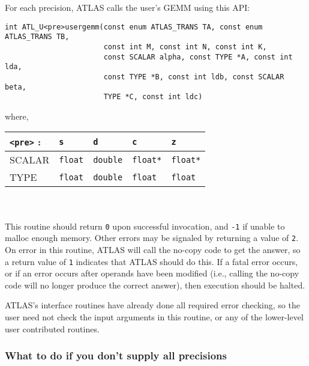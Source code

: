 \documentclass[11pt]{article}
\begin{document}
For each precision, ATLAS calls the user's GEMM using this API:
\begin{verbatim}
int ATL_U<pre>usergemm(const enum ATLAS_TRANS TA, const enum ATLAS_TRANS TB,
                       const int M, const int N, const int K,
                       const SCALAR alpha, const TYPE *A, const int lda,
                       const TYPE *B, const int ldb, const SCALAR beta,
                       TYPE *C, const int ldc)
\end{verbatim}
where,\\
\begin{tabular}{||l|l|l|l|l||}\hline\hline
\verb+<pre>+ : & {\tt s} & {\tt d} & {\tt c} & {\tt z} \\\hline\hline
SCALAR & {\tt float} & {\tt double} & {\tt float*} & {\tt float*} \\\hline
TYPE   & {\tt float} & {\tt double} & {\tt float} & {\tt float} \\\hline\hline
\end{tabular}\\\\

This routine should return {\tt 0} upon successful invocation, and 
{\tt -1} if unable to malloc enough memory.  Other errors may be
signaled by returning a value of {\tt 2}.  On error in this routine,
ATLAS will call the no-copy code to get the answer, so a return value
of {\tt 1} indicates that ATLAS should do this.  If a fatal error
occurs, or if an error occurs after operands have been modified (i.e.,
calling the no-copy code will no longer produce the correct answer),
then execution should be halted.

ATLAS's interface routines have already done all required error checking,
so the user need not check the input arguments in this routine, or any
of the lower-level user contributed routines.

\subsubsection{What to do if you don't supply all precisions}
\end{document}
